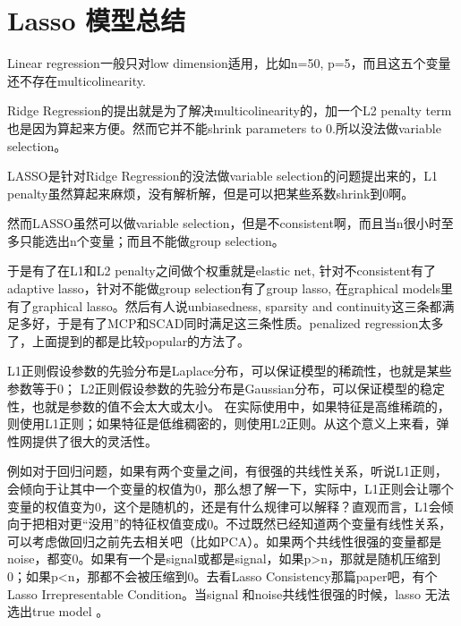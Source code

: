 {\fi      %



\iffalse %

\section{Lasso 模型总结}


Linear regression一般只对low dimension适用，比如n=50, p=5，而且这五个变量还不存在multicolinearity.

Ridge Regression的提出就是为了解决multicolinearity的，加一个L2 penalty term也是因为算起来方便。然而它并不能shrink parameters to 0.所以没法做variable selection。

LASSO是针对Ridge Regression的没法做variable selection的问题提出来的，L1 penalty虽然算起来麻烦，没有解析解，但是可以把某些系数shrink到0啊。

然而LASSO虽然可以做variable selection，但是不consistent啊，而且当n很小时至多只能选出n个变量；而且不能做group selection。

于是有了在L1和L2 penalty之间做个权重就是elastic net, 针对不consistent有了adaptive lasso，针对不能做group selection有了group lasso, 在graphical models里有了graphical lasso。然后有人说unbiasedness, sparsity and continuity这三条都满足多好，于是有了MCP和SCAD同时满足这三条性质。penalized regression太多了，上面提到的都是比较popular的方法了。

L1正则假设参数的先验分布是Laplace分布，可以保证模型的稀疏性，也就是某些参数等于0；
L2正则假设参数的先验分布是Gaussian分布，可以保证模型的稳定性，也就是参数的值不会太大或太小。
在实际使用中，如果特征是高维稀疏的，则使用L1正则；如果特征是低维稠密的，则使用L2正则。从这个意义上来看，弹性网提供了很大的灵活性。


例如对于回归问题，如果有两个变量之间，有很强的共线性关系，听说L1正则，会倾向于让其中一个变量的权值为0，那么想了解一下，实际中，L1正则会让哪个变量的权值变为0，这个是随机的，还是有什么规律可以解释？直观而言，L1会倾向于把相对更“没用”的特征权值变成0。不过既然已经知道两个变量有线性关系，可以考虑做回归之前先去相关吧（比如PCA）。如果两个共线性很强的变量都是noise，都变0。如果有一个是signal或都是signal，如果p>n，那就是随机压缩到0；如果p<n，那都不会被压缩到0。去看Lasso Consistency那篇paper吧，有个Lasso Irrepresentable Condition。当signal 和noise共线性很强的时候，lasso 无法选出true model 。

}
